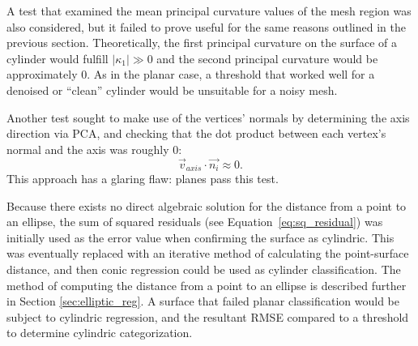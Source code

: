 A test that examined the mean principal curvature values of the mesh region was also considered, but it failed to prove useful for the same reasons outlined in the previous section.
Theoretically, the first principal curvature on the surface of a cylinder would fulfill $|\kappa_1| \gg 0$ and the second principal curvature would be approximately 0.
As in the planar case, a threshold that worked well for a denoised or ``clean'' cylinder would be unsuitable for a noisy mesh.

Another test sought to make use of the vertices' normals by determining the axis direction via PCA, and checking that the dot product between each vertex's normal and the axis was roughly 0:
\begin{equation*}
	\vec{v}_{axis} \cdot \vec{n_i} \approx 0.
\end{equation*}
This approach has a glaring flaw: planes pass this test.


Because there exists no direct algebraic solution for the distance from a point to an ellipse, the sum of squared residuals (see Equation~\eqref{eq:sq_residual}) was initially used as the error value when confirming the surface as cylindric.
This was eventually replaced with an iterative method of calculating the point-surface distance, and then conic regression could be used as cylinder classification.
The method of computing the distance from a point to an ellipse is described further in Section \ref{sec:elliptic_reg}.
A surface that failed planar classification would be subject to cylindric regression, and the resultant RMSE compared to a threshold to determine cylindric categorization.

